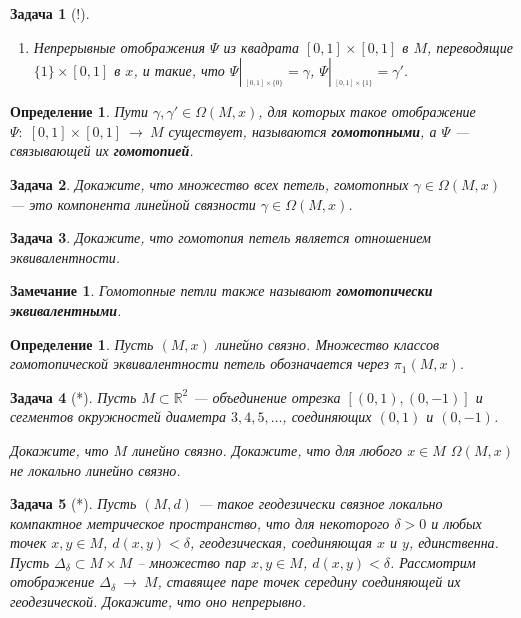\documentclass[12pt]{book}
\newcommand{\arrow}{{\:\longrightarrow\:}}
\newcommand{\restrict}[1]{{\left|_{{\phantom{|}\!\!}_{#1}}\right.}}
\def\R{{\mathbb R}}
\theoremstyle{upshape}
\newtheorem{zadacha}{Задача}[chapter]
\theoremstyle{generic}
\newtheorem{opredelenie}[teorema]{Определение}
\theoremstyle{upshapenonumber}
\newtheorem{zamechanie}{Замечание}[chapter]
\newcommand{\следствие}{%
     \refstepcounter{teorema}
     {\noindent\bf Следствие \thechapter.\arabic{teorema}:\ }}
\newcommand{\пример}{%
     \refstepcounter{teorema}
     {\noindent\bf Пример \thechapter.\arabic{teorema}:\ }}
\newcommand{\лемма}{%
     \refstepcounter{teorema}
     {\noindent\bf Лемма \thechapter.\arabic{teorema}:\ }}
\newcommand{\теорема}{%
     \refstepcounter{teorema}
     {\noindent\bf Теорема \thechapter.\arabic{teorema}:\ }}
\newcommand{\утверждение}{%
     \refstepcounter{teorema}
     {\noindent\bf Утверждение \thechapter.\arabic{teorema}:\ }}
\begin{document}
{\begin{zadacha}[!]
\begin{enumerate}
\item Непрерывные отображения $\Psi$ из квадрата
$[0,1]\times [0,1]$ в $M$, переводящие $\{1\}\times [0,1]$
в $x$, и такие, что 
$\Psi\restrict{[0,1]\times \{0\}} = \gamma$,
$\Psi\restrict{[0,1]\times \{1\}} = \gamma'$.
\end{enumerate}
\end{zadacha}

\begin{opredelenie}
Пути $\gamma, \gamma'\in \Omega(M,x)$, для
которых такое отображение 
$\Psi:\; [0,1]\times [0,1]\arrow M$ существует,
называются {\bf гомотопными}, а $\Psi$ --- связывающей их 
{\bf гомотопией}.
\end{opredelenie}

\begin{zadacha} 
Докажите, что множество всех петель, гомотопных
$\gamma\in \Omega(M,x)$ --- это компонента линейной
связности $\gamma\in \Omega(M,x)$.
\end{zadacha}

\begin{zadacha}
Докажите, что гомотопия петель является отношением
эквивалентности.
\end{zadacha}

\begin{zamechanie} 
Гомотопные петли также называют {\bf гомотопически
эквивалентными}.
\end{zamechanie}

\begin{opredelenie}
Пусть $(M, x)$ линейно связно. Множество классов 
гомотопической эк\-ви\-ва\-лент\-ности петель обозначается
через $\pi_1(M, x)$.
\end{opredelenie}

\begin{zadacha}[*]
Пусть $M\subset \R^2$ --- объединение отрезка 
$[(0,1), (0,-1)]$ и сегментов окружностей диаметра
$3, 4, 5, \dots$, соединяющих $(0,1)$ и $(0,-1)$.
\begin{center}
\end{center}
Докажите, что $M$ линейно связно. Докажите, что для любого $x\in M$
$\Omega(M,x)$ не локально линейно связно.
\end{zadacha}

\begin{zadacha}[*] \label{_edi_geode_Zadacha_}
Пусть $(M,d)$ --- такое геодезически связное 
локально компактное метрическое пространство,
что для некоторого $\delta >0$ и любых
точек $x, y\in M$, $d(x,y)<\delta$, 
геодезическая, соединяющая $x$ и $y$, единственна.
Пусть $\Delta_\delta\subset M\times M$ --
множество пар $x, y\in M$, $d(x,y)<\delta$.
Рассмотрим отображение $\Delta_\delta\arrow M$,
ставящее паре точек середину соединяющей
их геодезической. Докажите, что оно непрерывно.
\end{zadacha}

}
\end{document}
